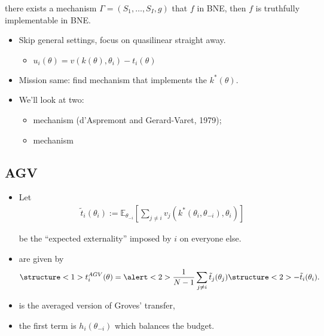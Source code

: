 \documentclass[english]{beamer}		%
\def\lyxframeend{} %
\begin{document}
\begin{theorem}
	 there exists a mechanism $\Gamma=(S_{1},\dots,S_{I},g)$ that  $f$ in BNE, 
	\alert{then} $f$ is \alert{truthfully implementable} in BNE.
\end{theorem}
\lyxframeend


\begin{itemize}
	\item Skip general settings, focus on \alert{quasilinear} straight away.
	\begin{itemize}
		\item $u_i(\theta) = v(k(\theta),\theta_i) - t_i(\theta)$
	\end{itemize}
	\item Mission same: find mechanism that implements the  $k^*(\theta)$.
	\pause
	\item We'll look at two:
	\begin{itemize}
		\item {} mechanism (d'Aspremont and Gerard-Varet, 1979);
		\item {} mechanism
	\end{itemize}
\end{itemize}
\lyxframeend


\subsection{AGV}

\begin{itemize}
	\item Let 
	\vspace{-0.5em}\begin{align*}
	\tilde{t}_i (\theta_i) := \mathbb{E}_{\theta_{-i}} \left[ \sum_{j \neq i} v_j (k^*(\theta_i,\theta_{-i}), \theta_i) \right]
	\end{align*}\vspace{-1em}
	
	be the ``expected externality'' imposed by $i$ on everyone else.
	\item {} are given by
	\vspace{-0.5em}\begin{align*}
	\structure<1>{t_i^{AGV} (\theta) = \alert<2>{\frac{1}{N-1} \sum_{j \neq i} \tilde{t}_j (\theta_j)} \structure<2>{- \tilde{t}_i (\theta_i)}}.
	\end{align*}\vspace{-1em}
	\pause
	\item {} is the averaged version of Groves' transfer,
	\item \alert{the first term} is $h_i(\theta_{-i})$ which balances the budget.
\end{itemize}
\lyxframeend
\end{document}
